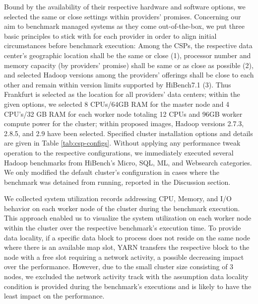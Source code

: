 \documentclass[review]{elsarticle}
\begin{document}
Bound by the availability of their respective hardware and software options, we selected the same or close settings within providers' promises. Concerning our aim to benchmark managed systems as they come out-of-the-box, we put three basic principles to stick with for each provider in order to align initial circumstances before benchmark execution: Among the CSPs, the respective data center's geographic location shall be the same or close (1), processor number and memory capacity (by providers' promise) shall be same or as close as possible (2), and selected Hadoop versions among the providers' offerings shall be close to each other and remain within version limits supported by HiBench7.1 (3). Thus Frankfurt is selected as the location for all providers' data centers; within the given options, we selected 8 CPUs/64GB RAM for the master node and 4 CPU's/32 GB RAM for each worker node totaling 12 CPUs and 96GB worker compute power for the cluster; within proposed images, Hadoop versions 2.7.3, 2.8.5, and 2.9 have been selected. Specified cluster installation options and details are given in Table \ref{tab:csp-configs}. Without applying any performance tweak operation to the respective configurations, we immediately executed several Hadoop benchmarks from HiBench's Micro, SQL, ML, and Websearch categories. We only modified the default cluster's configuration in cases where the benchmark was detained from running, reported in the Discussion section.

We collected system utilization records addressing CPU, Memory, and I/O behavior on each worker node of the cluster during the benchmark execution. This approach enabled us to visualize the system utilization on each worker node within the cluster over the respective benchmark's execution time. To provide data locality, if a specific data block to process does not reside on the same node where there is an available map slot, YARN transfers the respective block to the node with a free slot requiring a network activity, a possible decreasing impact over the performance. However, due to the small cluster size consisting of 3 nodes, we excluded the network activity track with the assumption data locality condition is provided during the benchmark's executions and is likely to have the least impact on the performance.
\end{document}

